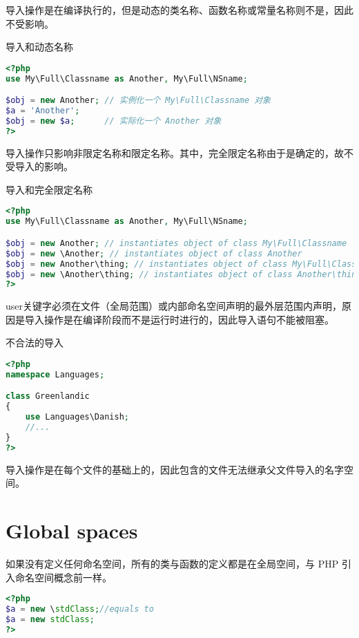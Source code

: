 导入操作是在编译执行的，但是动态的类名称、函数名称或常量名称则不是，因此不受影响。 



\begin{example}
导入和动态名称
\begin{lstlisting}[language=PHP]
<?php
use My\Full\Classname as Another, My\Full\NSname;

$obj = new Another; // 实例化一个 My\Full\Classname 对象
$a = 'Another';
$obj = new $a;      // 实际化一个 Another 对象
?>
\end{lstlisting}
\end{example}

导入操作只影响非限定名称和限定名称。其中，完全限定名称由于是确定的，故不受导入的影响。


\begin{example}
导入和完全限定名称
\begin{lstlisting}[language=PHP]
<?php
use My\Full\Classname as Another, My\Full\NSname;

$obj = new Another; // instantiates object of class My\Full\Classname
$obj = new \Another; // instantiates object of class Another
$obj = new Another\thing; // instantiates object of class My\Full\Classname\thing
$obj = new \Another\thing; // instantiates object of class Another\thing
?>
\end{lstlisting}
\end{example}

user关键字必须在文件（全局范围）或内部命名空间声明的最外层范围内声明，原因是导入操作是在编译阶段而不是运行时进行的，因此导入语句不能被阻塞。

\begin{example}
不合法的导入
\begin{lstlisting}[language=PHP]
<?php
namespace Languages;

class Greenlandic
{
    use Languages\Danish;
    //...
}
?>
\end{lstlisting}
\end{example}

导入操作是在每个文件的基础上的，因此包含的文件无法继承父文件导入的名字空间。

\section{Global spaces}

如果没有定义任何命名空间，所有的类与函数的定义都是在全局空间，与 PHP 引入命名空间概念前一样。

\begin{lstlisting}[language=PHP]
<?php
$a = new \stdClass;//equals to
$a = new stdClass;
?>
\end{lstlisting}

